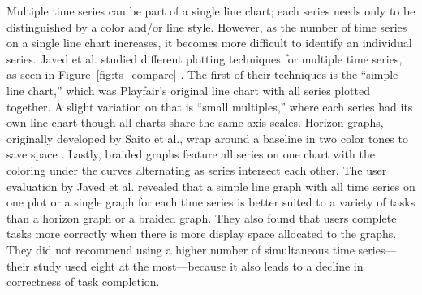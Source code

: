 Multiple time series can be part of a single line chart; each series needs only to be distinguished by a color and/or line style.  However, as the number of time series on a single line chart increases, it becomes more difficult to identify an individual series.  Javed et al. studied different plotting techniques for multiple time series, as seen in Figure~\ref{fig:ts_compare} \cite{javed2010}.  The first of their techniques is the ``simple line chart,'' which was Playfair's original line chart with all series plotted together.  A slight variation on that is ``small multiples,'' where each series had its own line chart though all charts share the same axis scales.  Horizon graphs, originally developed by Saito et al., wrap around a baseline in two color tones to save space \cite{saitoTwoTone}.  Lastly, braided graphs feature all series on one chart with the coloring under the curves alternating as series intersect each other.  The user evaluation by Javed et al. revealed that a simple line graph with all time series on one plot or a single graph for each time series is better suited to a variety of tasks than a horizon graph or a braided graph.  They also found that users complete tasks more correctly when there is more display space allocated to the graphs.  They did not recommend using a higher number of simultaneous time series---their study used eight at the most---because it also leads to a decline in correctness of task completion.

